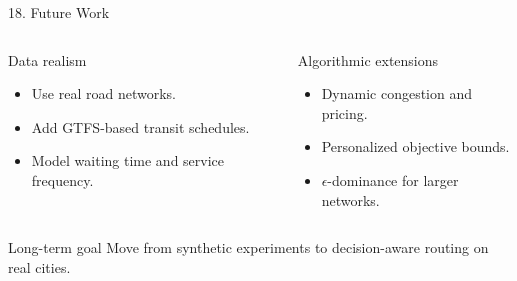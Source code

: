 \documentclass[aspectratio=169]{beamer}
\begin{document}
\begin{frame}{18. Future Work}
    \begin{columns}[T]
        \begin{block}{Data realism}
            \begin{itemize}
                \item Use real road networks.
                \item Add GTFS-based transit schedules.
                \item Model waiting time and service frequency.
            \end{itemize}
        \end{block}

        \begin{block}{Algorithmic extensions}
            \begin{itemize}
                \item Dynamic congestion and pricing.
                \item Personalized objective bounds.
                \item \(\epsilon\)-dominance for larger networks.
            \end{itemize}
        \end{block}
    \end{columns}

    \begin{alertblock}{Long-term goal}
        Move from synthetic experiments to decision-aware routing on real cities.
    \end{alertblock}
\end{frame}
\end{document}
